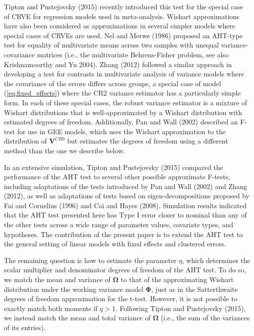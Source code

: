 \documentclass[12pt]{article}
\begin{document}
Tipton and Pustejovsky (2015) recently introduced this test for the
special case of CRVE for regression models used in meta-analysis.
Wishart approximations have also been considered as approximations in
several simpler models where special cases of CRVEs are used. Nel and
Merwe (1986) proposed an AHT-type test for equality of multivariate
means across two samples with unequal variance-covariance matrices
(i.e., the multivariate Behrens-Fisher problem, see also Krishnamoorthy
and Yu 2004). Zhang (2012) followed a similar approach in developing a
test for contrasts in multivariate analysis of variance models where the
covariance of the errors differs across groups, a special case of model
(\ref{eq:fixed_effects}) where the CR2 variance estimator has a
particularly simple form. In each of these special cases, the robust
variance estimator is a mixture of Wishart distributions that is
well-approximated by a Wishart distribution with estimated degrees of
freedom. Additionally, Pan and Wall (2002) described an F-test for use
in GEE models, which uses the Wishart approximation to the distribution
of \(\mathbf{V}^{CR0}\) but estimates the degrees of freedom using a
different method than the one we describe below.

In an extensive simulation, Tipton and Pustejovsky (2015) compared the
performance of the AHT test to several other possible approximate
F-tests, including adaptations of the tests introduced by Pan and Wall
(2002) and Zhang (2012), as well as adaptations of tests based on
eigen-decompositions proposed by Fai and Cornelius (1996) and Cai and
Hayes (2008). Simulation results indicated that the AHT test presented
here has Type I error closer to nominal than any of the other tests
across a wide range of parameter values, covariate types, and
hypotheses. The contribution of the present paper is to extend the AHT
test to the general setting of linear models with fixed effects and
clustered errors.

The remaining question is how to estimate the parameter \(\eta\), which
determines the scalar multiplier and denominator degrees of freedom of
the AHT test. To do so, we match the mean and variance of
\(\boldsymbol\Omega\) to that of the approximating Wishart distribution
under the working variance model \(\boldsymbol\Phi\), just as in the
Satterthwaite degrees of freedom approximation for the t-test. However,
it is not possible to exactly match both moments if \(q > 1\). Following
Tipton and Pustejovsky (2015), we instead match the mean and total
variance of \(\boldsymbol\Omega\) (i.e., the sum of the variances of its
entries).
\end{document}

